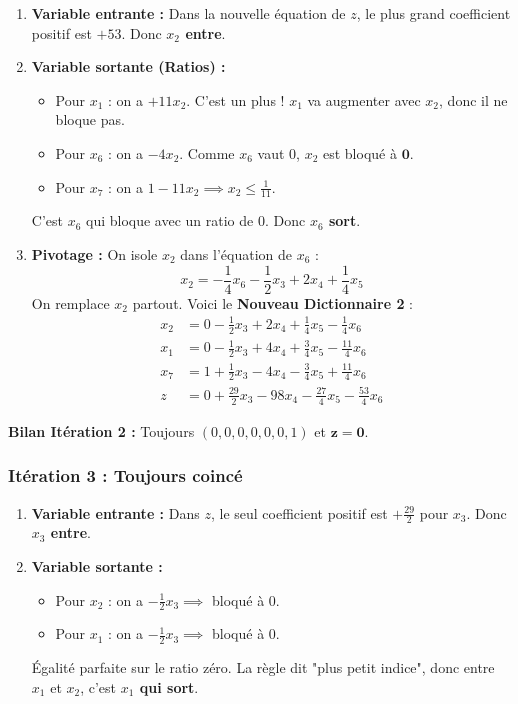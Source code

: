 \documentclass[12pt,a4paper]{article}
\begin{document}
\begin{enumerate}
    \item \textbf{Variable entrante :} 
    Dans la nouvelle équation de $z$, le plus grand coefficient positif est \textbf{$+53$}. Donc \textbf{$x_2$ entre}.

    \item \textbf{Variable sortante (Ratios) :}
    \begin{itemize}
        \item Pour $x_1$ : on a $+11x_2$. C'est un plus ! $x_1$ va augmenter avec $x_2$, donc il ne bloque pas.
        \item Pour $x_6$ : on a $-4x_2$. Comme $x_6$ vaut $0$, $x_2$ est bloqué à $\mathbf{0}$.
        \item Pour $x_7$ : on a $1 - 11x_2 \implies x_2 \leq \frac{1}{11}$.
    \end{itemize}
    C'est $x_6$ qui bloque avec un ratio de $0$. Donc \textbf{$x_6$ sort}.

    \item \textbf{Pivotage :} 
    On isole $x_2$ dans l'équation de $x_6$ :
    $$x_2 = -\frac{1}{4}x_6 - \frac{1}{2}x_3 + 2x_4 + \frac{1}{4}x_5$$
    On remplace $x_2$ partout. Voici le \textbf{Nouveau Dictionnaire 2} :
    \begin{align*}
    x_2 &= 0 - \frac{1}{2}x_3 + 2x_4 + \frac{1}{4}x_5 - \frac{1}{4}x_6\\
    x_1 &= 0 - \frac{1}{2}x_3 + 4x_4 + \frac{3}{4}x_5 - \frac{11}{4}x_6\\
    x_7 &= 1 + \frac{1}{2}x_3 - 4x_4 - \frac{3}{4}x_5 + \frac{11}{4}x_6\\
    z &= 0 + \frac{29}{2}x_3 - 98x_4 - \frac{27}{4}x_5 - \frac{53}{4}x_6
    \end{align*}
\end{enumerate}
\textbf{Bilan Itération 2 :} Toujours $(0,0,0,0,0,0,1)$ et $\mathbf{z = 0}$.

\hrulefill

\subsubsection*{Itération 3 : Toujours coincé}

\begin{enumerate}
    \item \textbf{Variable entrante :} 
    Dans $z$, le seul coefficient positif est \textbf{$+\frac{29}{2}$} pour $x_3$. Donc \textbf{$x_3$ entre}.

    \item \textbf{Variable sortante :}
    \begin{itemize}
        \item Pour $x_2$ : on a $-\frac{1}{2}x_3 \implies$ bloqué à $0$.
        \item Pour $x_1$ : on a $-\frac{1}{2}x_3 \implies$ bloqué à $0$.
    \end{itemize}
    Égalité parfaite sur le ratio zéro. La règle dit "plus petit indice", donc entre $x_1$ et $x_2$, c'est \textbf{$x_1$ qui sort}.
\end{enumerate}
\end{document}
